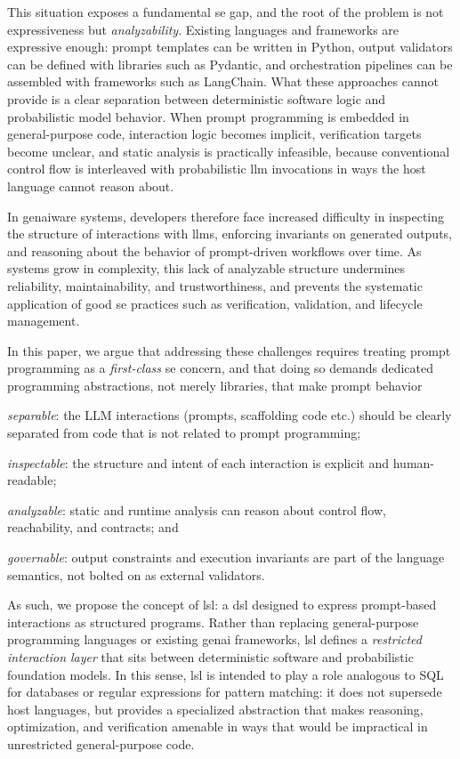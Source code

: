 \documentclass[manuscript,screen]{acmart}
\begin{document}
This situation exposes a fundamental \ac{se} gap, and the root of the problem is not expressiveness but \emph{analyzability}.
Existing languages and frameworks are expressive enough: prompt templates can be written in Python, output validators can be defined with libraries such as Pydantic, and orchestration pipelines can be assembled with frameworks such as LangChain.
What these approaches cannot provide is a clear separation between deterministic software logic and probabilistic model behavior.
When prompt programming is embedded in general-purpose code, interaction logic becomes implicit, verification targets become unclear, and static analysis is practically infeasible, because conventional control flow is interleaved with probabilistic \ac{llm} invocations in ways the host language cannot reason about.

In \ac{genai}ware systems, developers therefore face increased difficulty in inspecting the structure of interactions with \acp{llm}, enforcing invariants on generated outputs, and reasoning about the behavior of prompt-driven workflows over time.
As systems grow in complexity, this lack of analyzable structure undermines reliability, maintainability, and trustworthiness, and prevents the systematic application of good \ac{se} practices such as verification, validation, and lifecycle management.

In this paper, we argue that addressing these challenges requires treating prompt programming as a \emph{first-class} \ac{se} concern, and that doing so demands dedicated programming abstractions, not merely libraries, that make prompt behavior
\begin{enumerate*}[label=(\roman*)]
    \item \emph{separable}: the LLM interactions (prompts, scaffolding code etc.) should be clearly separated from code that is not related to prompt programming;  
  \item \emph{inspectable}: the structure and intent of each interaction is explicit and human-readable;
  \item \emph{analyzable}: static and runtime analysis can reason about control flow, reachability, and contracts; and
  \item \emph{governable}: output constraints and execution invariants are part of the language semantics, not bolted on as external validators.
\end{enumerate*}
As such, we propose the concept of \ac{lsl}: a \ac{dsl} designed to express prompt-based interactions as structured programs.
Rather than replacing general-purpose programming languages or existing \ac{genai} frameworks, \ac{lsl} defines a \emph{restricted interaction layer} that sits between deterministic software and probabilistic foundation models.
In this sense, \ac{lsl} is intended to play a role analogous to SQL for databases or regular expressions for pattern matching: it does not supersede host languages, but provides a specialized abstraction that makes reasoning, optimization, and verification amenable in ways that would be impractical in unrestricted general-purpose code.
\end{document}
